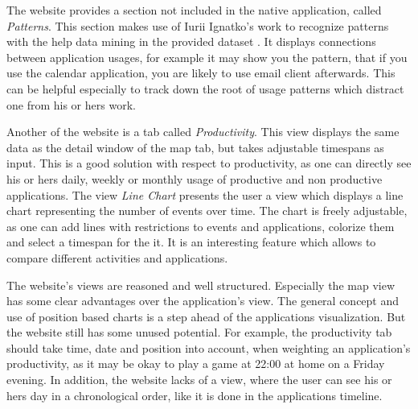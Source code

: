 The  website provides a section not included in the native application, called \emph{Patterns}. This section makes use of Iurii Ignatko's work to recognize patterns with the help data mining in the provided dataset \cite{iuriisthesis}. It displays connections between application usages, for example it may show you the pattern, that if you use the calendar application, you are likely to use email client afterwards. This can be helpful especially to track down the root of usage patterns which distract one from his or hers work.

Another  of the website is a tab called \emph{Productivity}. This view displays the same data as the detail window of the map tab, but takes adjustable timespans as input. This is a good solution with respect to productivity, as one can directly see his or hers daily, weekly or monthly usage of productive and non productive applications. The view \emph{Line Chart} presents the user a view which displays a line chart representing the number of events over time. The chart is freely adjustable, as one can add lines with restrictions to events and applications, colorize them and select a timespan for the it. It is an interesting feature which allows to compare different activities and applications. 

The website's views are reasoned and well structured. Especially the map view has some clear advantages over the application's view. The general concept and use of position based charts is a step ahead of the applications visualization. But the website still has some unused potential. For example, the productivity tab should take time, date and position into account, when weighting an application's productivity, as it may be okay to play a game at 22:00 at home on a Friday evening. In addition, the website lacks of a view, where the user can see his or hers day in a chronological order, like it is done in the applications timeline.